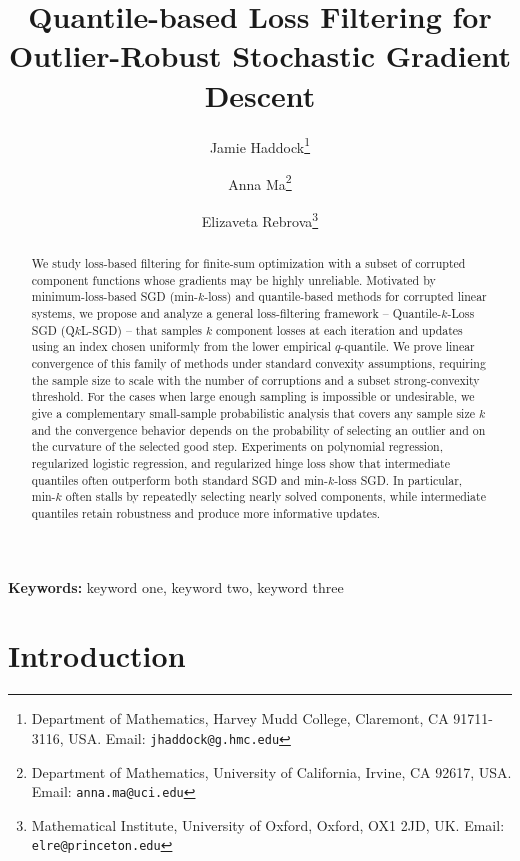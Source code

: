 \documentclass[11pt]{article}
\title{Quantile-based Loss Filtering for Outlier-Robust Stochastic Gradient Descent}
\author{Jamie Haddock\thanks{Department of Mathematics, Harvey Mudd College, Claremont, CA 91711-3116, USA. Email: \texttt{jhaddock@g.hmc.edu}} \and
Anna Ma\thanks{Department of Mathematics, University of California, Irvine, CA 92617, USA. Email: \texttt{anna.ma@uci.edu}} \and
Elizaveta Rebrova\thanks{Mathematical Institute, University of Oxford,  Oxford, OX1 2JD, UK. Email: \texttt{elre@princeton.edu}}}
\date{}
\newenvironment{keywords}{\par\noindent\textbf{Keywords: }}{\par}
\begin{document}
\maketitle

\begin{abstract}
{We study loss-based filtering for finite-sum optimization with a subset of
corrupted component functions whose gradients may be highly unreliable.
Motivated by minimum-loss-based SGD (min-$k$-loss) and quantile-based methods for corrupted linear
systems, we propose and
analyze a general loss-filtering framework  -- Quantile-\(k\)-Loss SGD (Q\(k\)L-SGD) --   that
samples \(k\) component losses at each iteration and updates using an index chosen uniformly
from the lower empirical \(q\)-quantile.
We prove linear convergence of this family of methods under standard convexity assumptions,
requiring the sample size to scale with the number of corruptions and a subset
strong-convexity threshold. For the cases when large enough sampling is impossible or undesirable, we
give a complementary small-sample probabilistic analysis that covers any sample size $k$ and the
convergence behavior depends on the probability of selecting an outlier and on
the curvature of the selected good step. Experiments on polynomial regression,
regularized logistic regression, and regularized hinge loss show that
intermediate quantiles often outperform both standard SGD and min-\(k\)-loss
SGD. In particular, min-\(k\) often stalls by repeatedly selecting nearly solved
components, while intermediate quantiles retain robustness and produce more
informative updates.}


\end{abstract}


\begin{keywords}
  keyword one, keyword two, keyword three
\end{keywords}

\section{Introduction}
\end{document}

